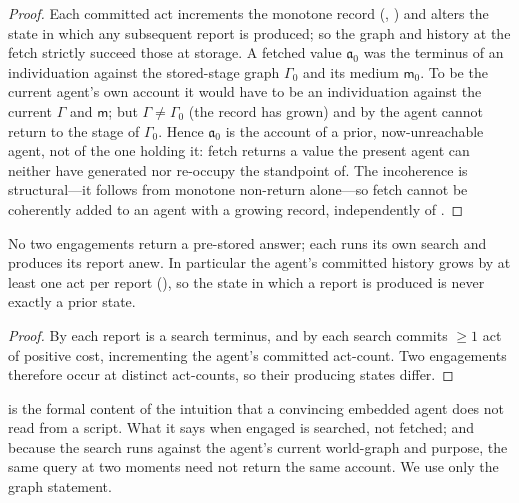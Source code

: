 \documentclass[11pt,twocolumn,a4paper]{article}
\newcommand{\Gph}{\Gamma}
\newcommand{\med}{\mathsf{m}}
\newcommand{\acct}{\mathfrak{a}}   %
\begin{document}
\begin{proof}
Each committed act increments the monotone record (,
) and alters the state in which any subsequent
report is produced; so the graph and history at the fetch strictly succeed
those at storage. A fetched value $\acct_0$ was the terminus of an individuation
against the stored-stage graph $\Gph_0$ and its medium $\med_0$. To be the
current agent's own account it would have to be an individuation against the
current $\Gph$ and $\med$; but $\Gph\neq\Gph_0$ (the record has grown) and
by  the agent cannot return to the stage of
$\Gph_0$. Hence $\acct_0$ is the account of a prior, now-unreachable agent,
not of the one holding it: fetch returns a value the present agent can
neither have generated nor re-occupy the standpoint of. The incoherence is
structural---it follows from monotone non-return alone---so fetch cannot be
coherently added to an agent with a growing record, independently of
.
\end{proof}

\begin{corollary}
\label{cor:fresh}
No two engagements return a pre-stored answer; each runs its own search and
produces its report anew. In particular the agent's committed history grows
by at least one act per report (), so the state in which a
report is produced is never exactly a prior state.
\end{corollary}

\begin{proof}
By  each report is a search terminus, and by
 each search commits $\ge1$ act of positive cost,
incrementing the agent's committed act-count. Two engagements therefore
occur at distinct act-counts, so their producing states differ.
\end{proof}

\begin{remark}
\label{rem:nocanned}
 is the formal content of the intuition that a
convincing embedded agent does not read from a script. What it says when
engaged is searched, not fetched; and because the search runs against the
agent's current world-graph and purpose, the same query at two moments need
not return the same account. We use only the graph statement.
\end{remark}

\end{document}
